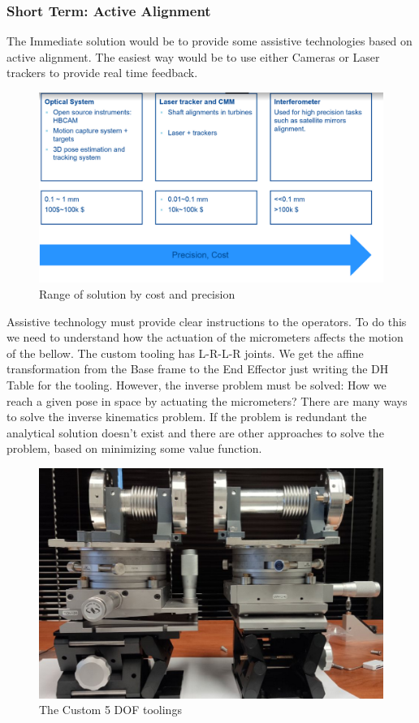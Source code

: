 \documentclass[12pt,a4paper]{article}
\begin{document}
\subsubsection{Short Term: Active Alignment}
The Immediate solution would be to provide some assistive technologies based on active alignment. The easiest way would be to use either Cameras or Laser trackers to provide real time feedback.

\begin{figure}[h!]
\centering
\includegraphics[width=\textwidth]{10.png}
\caption{Range of solution by cost and precision}
\end{figure}

Assistive technology must provide clear instructions to the operators. To do this we need to understand how the actuation of the micrometers affects the motion of the bellow. The custom tooling has L-R-L-R joints. We get the affine transformation from the Base frame to the End Effector just writing the DH Table for the tooling. However, the inverse problem must be solved:  How we reach a given pose in space by actuating the micrometers? There are many ways to solve the inverse kinematics problem. If the problem is redundant the analytical solution doesn't exist and there are other approaches to solve the problem, based on minimizing some value function. 

\begin{figure}[h!]
\centering
\includegraphics[width=\textwidth]{7.png}
\caption{The Custom 5 DOF toolings}
\end{figure}
\end{document}

